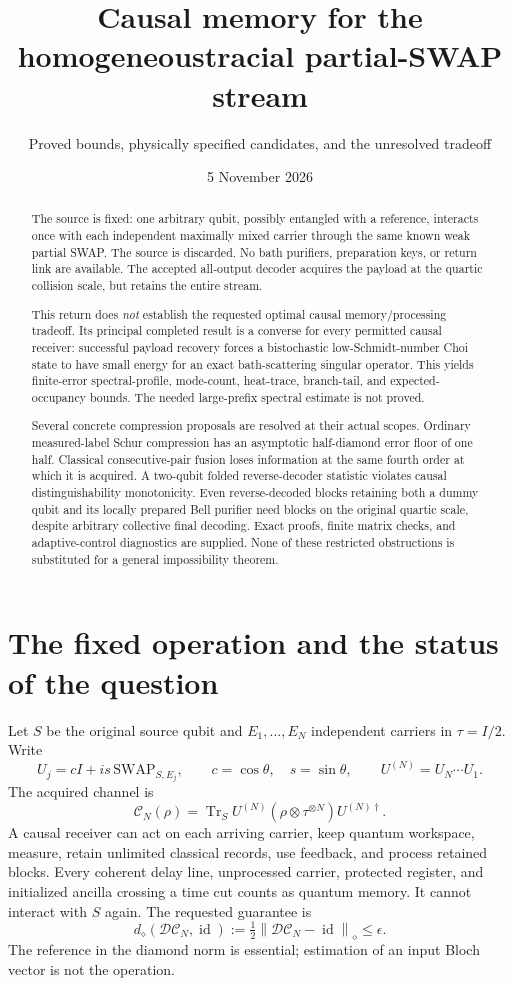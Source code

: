 \documentclass[11pt]{article}
\title{Causal memory for the homogeneous\newline tracial partial-SWAP stream}
\author{Proved bounds, physically specified candidates, and the unresolved tradeoff}
\date{5 November 2026}
\newcommand{\Tr}{\operatorname{Tr}}
\newcommand{\id}{\operatorname{id}}
\newcommand{\norm}[1]{\left\lVert#1\right\rVert}
\newcommand{\dd}{d_{\diamond}}
\begin{document}
\maketitle
\begin{abstract}
The source is fixed: one arbitrary qubit, possibly entangled with a reference,
interacts once with each independent maximally mixed carrier through the same
known weak partial SWAP. The source is discarded. No bath purifiers, preparation
keys, or return link are available. The accepted all-output decoder acquires the
payload at the quartic collision scale, but retains the entire stream.

This return does \emph{not} establish the requested optimal causal
memory/processing tradeoff. Its principal completed result is a converse for
every permitted causal receiver: successful payload recovery forces a
bistochastic low-Schmidt-number Choi state to have small energy for an exact
bath-scattering singular operator. This yields finite-error spectral-profile,
mode-count, heat-trace, branch-tail, and expected-occupancy bounds. The needed
large-prefix spectral estimate is not proved.

Several concrete compression proposals are resolved at their actual scopes.
Ordinary measured-label Schur compression has an asymptotic half-diamond error
floor of one half. Classical consecutive-pair fusion loses information at the
same fourth order at which it is acquired. A two-qubit folded reverse-decoder
statistic violates causal distinguishability monotonicity. Even reverse-decoded
blocks retaining both a dummy qubit and its locally prepared Bell purifier need
blocks on the original quartic scale, despite arbitrary collective final
decoding. Exact proofs, finite matrix checks, and adaptive-control diagnostics
are supplied. None of these restricted obstructions is substituted for a
general impossibility theorem.
\end{abstract}

\section{The fixed operation and the status of the question}

Let $S$ be the original source qubit and $E_1,\ldots,E_N$ independent carriers
in $\tau=I/2$. Write
\[
 U_j=cI+is\,\mathrm{SWAP}_{S,E_j},\qquad
 c=\cos\theta,\quad s=\sin\theta,\qquad
 U^{(N)}=U_N\cdots U_1.
\]
The acquired channel is
\[
 \mathcal C_N(\rho)=\Tr_S U^{(N)}(\rho\otimes\tau^{\otimes N})U^{(N)\dagger}.
\]
A causal receiver can act on each arriving carrier, keep quantum workspace,
measure, retain unlimited classical records, use feedback, and process retained
blocks. Every coherent delay line, unprocessed carrier, protected register, and
initialized ancilla crossing a time cut counts as quantum memory. It cannot
interact with $S$ again. The requested guarantee is
\[
 \dd(\mathcal D\mathcal C_N,\id)
 :=\tfrac12\norm{\mathcal D\mathcal C_N-\id}_{\diamond}\le\epsilon.
\]
The reference in the diamond norm is essential; estimation of an input Bloch
vector is not the operation.
\end{document}
